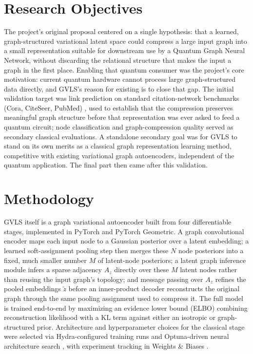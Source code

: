 \documentclass[11pt]{article}
\begin{document}
\section*{Research Objectives}
The project's original proposal centered on a single hypothesis: that a
learned, graph-structured variational latent space could compress a large
input graph into a small representation suitable for downstream use by a
Quantum Graph Neural Network, without discarding the relational structure
that makes the input a graph in the first place. Enabling that quantum
consumer was the project's core motivation: current quantum hardware cannot process large graph-structured data directly, and GVLS's reason for existing is to close
that gap. The initial validation target was link prediction on standard
citation-network benchmarks (Cora, CiteSeer, PubMed) \cite{yang2016revisiting}, used to establish that
the compression preserves meaningful graph structure before that
representation was ever asked to feed a quantum circuit; node classification
and graph-compression quality served as secondary classical evaluations. A
standalone secondary goal was for GVLS to stand on its own merits as a
classical graph representation learning method, competitive with existing
variational graph autoencoders, independent of the quantum application. The final part then came after this validation.

\section*{Methodology}

GVLS itself is a graph variational autoencoder built from four differentiable
stages, implemented in PyTorch and PyTorch Geometric. A graph convolutional
encoder maps each input node to a Gaussian posterior over a latent embedding;
a learned soft-assignment pooling step \cite{ying2018diffpool} then merges these $N$ node posteriors
into a fixed, much smaller number $M$ of latent-node posteriors; a latent
graph inference module infers a sparse adjacency $A_z$ directly over these
$M$ latent nodes rather than reusing the input graph's topology; and message
passing over $A_z$ refines the pooled embeddings $\tilde z$ before an
inner-product decoder reconstructs the original graph through the same
pooling assignment used to compress it. The full model is trained end-to-end
by maximizing an evidence lower bound (ELBO) combining reconstruction
likelihood with a KL term against either an isotropic or graph-structured
prior. Architecture and hyperparameter choices for the classical stage were
selected via Hydra-configured training runs \cite{yadan2019hydra} and
Optuna-driven neural architecture search \cite{akiba2019optuna}, with
experiment tracking in Weights \& Biases \cite{biewald2020wandb}.
\end{document}
